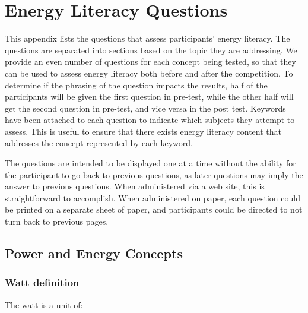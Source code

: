 
\appendix
\chapter{Energy Literacy Questions}

This appendix lists the questions that assess participants' energy literacy. The questions are separated into sections based on the topic they are addressing. We provide an even number of questions for each concept being tested, so that they can be used to assess energy literacy both before and after the competition. To determine if the phrasing of the question impacts the results, half of the participants will be given the first question in pre-test, while the other half will get the second question in pre-test, and vice versa in the post test. Keywords have been attached to each question to indicate which subjects they attempt to assess. This is useful to ensure that there exists energy literacy content that addresses the concept represented by each keyword.

The questions are intended to be displayed one at a time without the ability for the participant to go back to previous questions, as later questions may imply the answer to previous questions. When administered via a web site, this is straightforward to accomplish. When administered on paper, each question could be printed on a separate sheet of paper, and participants could be directed to not turn back to previous pages.

\section{Power and Energy Concepts}

\subsection{Watt definition}

\begin{question}
	\item The watt is a unit of:
\end{question}

